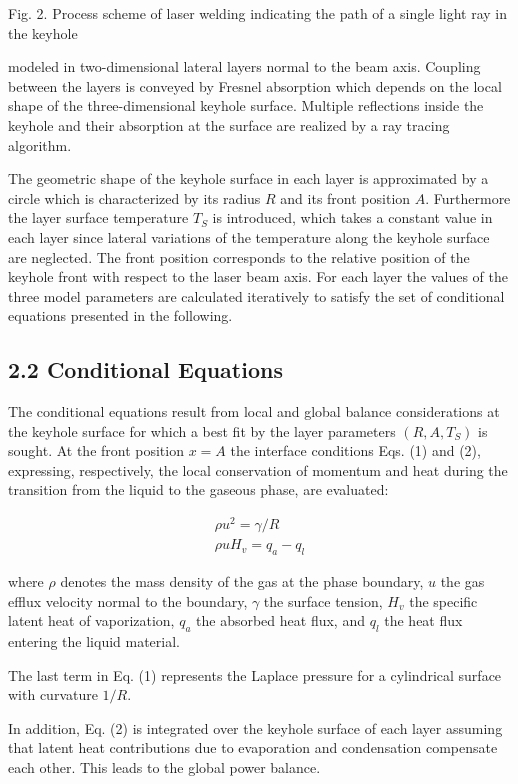 \documentclass[10pt]{article}
\begin{document}
Fig. 2. Process scheme of laser welding indicating the path of a single light ray in the keyhole

modeled in two-dimensional lateral layers normal to the beam axis. Coupling between the layers is conveyed by Fresnel absorption which depends on the local shape of the three-dimensional keyhole surface. Multiple reflections inside the keyhole and their absorption at the surface are realized by a ray tracing algorithm.

The geometric shape of the keyhole surface in each layer is approximated by a circle which is characterized by its radius $R$ and its front position $A$. Furthermore the layer surface temperature $T_{S}$ is introduced, which takes a constant value in each layer since lateral variations of the temperature along the keyhole surface are neglected. The front position corresponds to the relative position of the keyhole front with respect to the laser beam axis. For each layer the values of the three model parameters are calculated iteratively to satisfy the set of conditional equations presented in the following.

\subsection*{2.2 Conditional Equations}
The conditional equations result from local and global balance considerations at the keyhole surface for which a best fit by the layer parameters $\left(R, A, T_{S}\right)$ is sought. At the front position $x=A$ the interface conditions Eqs. (1) and (2), expressing, respectively, the local conservation of momentum and heat during the transition from the liquid to the gaseous phase, are evaluated:


\begin{gather*}
\rho u^{2}=\gamma / R  \tag{1}\\
\rho u H_{v}=q_{a}-q_{l} \tag{2}
\end{gather*}


where $\rho$ denotes the mass density of the gas at the phase boundary, $u$ the gas efflux velocity normal to the boundary, $\gamma$ the surface tension, $H_{v}$ the specific latent heat of vaporization, $q_{a}$ the absorbed heat flux, and $q_{l}$ the heat flux entering the liquid material.

The last term in Eq. (1) represents the Laplace pressure for a cylindrical surface with curvature $1 / R$.

In addition, Eq. (2) is integrated over the keyhole surface of each layer assuming that latent heat contributions due to evaporation and condensation compensate each other. This leads to the global power balance.
\end{document}
